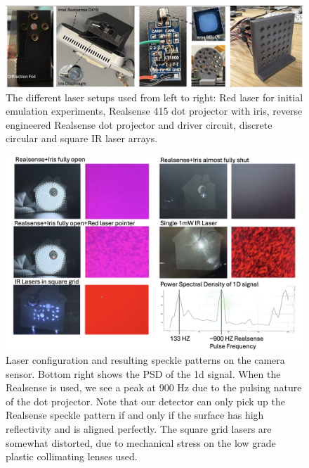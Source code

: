 \begin{figure}[t]
\centering
\includegraphics[width=\textwidth]{figures/eval/lasers}
\caption{The different laser setups used from left to right: Red laser for initial emulation experiments, 
Realsense 415 dot projector with iris, reverse engineered Realsense dot projector and driver circuit, 
discrete circular and square IR laser arrays.}
\label{fig:lasers}
\end{figure}

    

\begin{figure}[t]
\centering
\includegraphics[width=\textwidth]{figures/results/configs}
\caption{Laser configuration and resulting speckle patterns on the camera sensor. Bottom right shows the PSD of the 1d signal. When the Realsense is used, we see a peak at 900 Hz due to the pulsing nature of the dot projector. Note that our detector can only pick up the Realsense speckle pattern if and only if the surface has high reflectivity and is aligned perfectly. The square grid lasers are somewhat distorted, due to mechanical stress on the low grade plastic collimating lenses used.}
\label{fig:config}
\end{figure}

